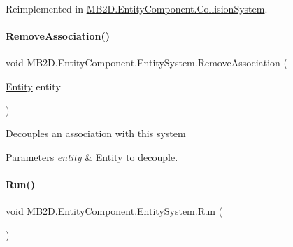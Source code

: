 Reimplemented in \hyperlink{class_m_b2_d_1_1_entity_component_1_1_collision_system_a06249adc606475cdc35f28783a1b27c4}{M\+B2\+D.\+Entity\+Component.\+Collision\+System}.

\hypertarget{class_m_b2_d_1_1_entity_component_1_1_entity_system_a6fa9406e1f4a0ca8ddf21cf04be3abe3}{}\label{class_m_b2_d_1_1_entity_component_1_1_entity_system_a6fa9406e1f4a0ca8ddf21cf04be3abe3} 
\paragraph{\texorpdfstring{Remove\+Association()}{RemoveAssociation()}}
{\footnotesize\ttfamily void M\+B2\+D.\+Entity\+Component.\+Entity\+System.\+Remove\+Association (\begin{DoxyParamCaption}\item[{\hyperlink{class_m_b2_d_1_1_entity_component_1_1_entity}{Entity}}]{entity }\end{DoxyParamCaption})\hspace{0.3cm}{\ttfamily [inline]}}



Decouples an association with this system 


\begin{DoxyParams}{Parameters}
{\em entity} & \hyperlink{class_m_b2_d_1_1_entity_component_1_1_entity}{Entity} to decouple.\\
\hline
\end{DoxyParams}
\hypertarget{class_m_b2_d_1_1_entity_component_1_1_entity_system_a3a1a74c4d3f8f0f452e0cdaa5515face}{}\label{class_m_b2_d_1_1_entity_component_1_1_entity_system_a3a1a74c4d3f8f0f452e0cdaa5515face} 
\paragraph{\texorpdfstring{Run()}{Run()}}
{\footnotesize\ttfamily void M\+B2\+D.\+Entity\+Component.\+Entity\+System.\+Run (\begin{DoxyParamCaption}{ }\end{DoxyParamCaption})\hspace{0.3cm}{\ttfamily [inline]}}



